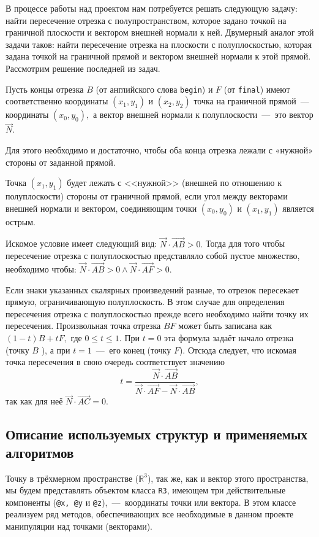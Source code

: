 В процессе работы над проектом нам потребуется решать следующую задачу: найти пересечение отрезка с полупространством, которое задано точкой на граничной плоскости и вектором внешней нормали к ней. Двумерный аналог этой задачи таков: найти пересечение отрезка на плоскости с полуплоскостью, которая задана точкой на граничной прямой и вектором внешней нормали к этой прямой. Рассмотрим решение последней из задач.

Пусть концы отрезка $B$ (от английского слова \verb|begin|) и $F$ (от \verb|final|) имеют соответственно координаты $(x_1, y_1)$ и $(x_2, y_2)$ точка на граничной прямой~---  координаты $(x_0, y_0),$ а вектор внешней нормали к полуплоскости~---  это вектор $\overrightarrow N$.

Для этого необходимо и достаточно, чтобы оба конца отрезка лежали с «нужной» стороны от заданной прямой.

Точка $(x_1, y_1)$ будет лежать с <<нужной>> (внешней по отношению к полуплоскости) стороны от граничной прямой, если угол между векторами внешней нормали и вектором, соединяющим точки $(x_0, y_0)$ и $(x_1, y_1)$ является острым.

Искомое условие имеет следующий вид: $\overrightarrow N \cdot \overrightarrow{AB} > 0.$
Тогда для того чтобы пересечение отрезка с полуплоскостью представляло собой пустое множество, необходимо чтобы:
$\overrightarrow N \cdot\overrightarrow{AB} > 0 \wedge \overrightarrow N \cdot \overrightarrow{AF} > 0$.

Если знаки указанных скалярных произведений разные, то отрезок пересекает прямую, ограничивающую полуплоскость. В этом случае для определения пересечения отрезка с полуплоскостью прежде всего необходимо найти точку их пересечения. Произвольная точка отрезка $BF$ может быть записана как $(1-t)B + tF,$ где $0 \leqslant t \leqslant 1$. При $t = 0$ эта формула задаёт начало отрезка (точку $B$ ), а при $t=1$~---  его конец (точку $F$). Отсюда следует, что искомая точка пересечения в свою очередь соответствует значению  $$t = \frac{\overrightarrow N \cdot \overrightarrow{AB}} {\overrightarrow N \cdot \overrightarrow{AF} - \overrightarrow N \cdot \overrightarrow{AB}},$$ так как для неё $\overrightarrow N \cdot \overrightarrow{AC} = 0$.
 
\subsection*{ Описание используемых структур и применяемых алгоритмов}

Точку в трёхмерном пространстве ($\mathbb R^3$), так же, как и вектор этого пространства, мы будем представлять объектом класса \verb|R3|, имеющем три действительные компоненты (\verb|@x, @y| и \verb|@z|),~---  координаты точки или вектора. В этом классе реализуем ряд методов, обеспечивающих все необходимые в данном проекте манипуляции над точками  (векторами).

